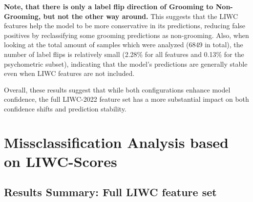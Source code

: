 \textbf{Note, that there is only a label flip direction of Grooming to Non-Grooming, but not the other way around.} This suggests that the LIWC features help the model to be more conservative in its predictions, reducing false positives by reclassifying some grooming predictions as non-grooming. Also, when looking at the total amount of samples which were analyzed (6849 in total), the number of label flips is relatively small (2.28\% for all features and 0.13\% for the psychometric subset), indicating that the model's predictions are generally stable even when LIWC features are not included.

Overall, these results suggest that while both configurations enhance model confidence, the full LIWC-2022 feature set has a more substantial impact on both confidence shifts and prediction stability.


\section{Missclassification Analysis based on LIWC-Scores} \label{sec:misclassification_analysis}


\subsection{Results Summary: Full LIWC feature set}



